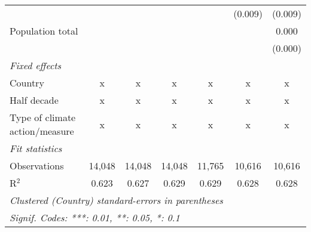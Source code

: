 \begin{tabular}{lcccccc}
                                                                                        &         &               &                &                & (0.009)        & (0.009)\\   
   Population total                                                                     &         &               &                &                &                & 0.000\\   
                                                                                        &         &               &                &                &                & (0.000)\\   
   \emph{Fixed effects}\\
   Country                                                                              & x       & x             & x              & x              & x              & x\\  
   Half decade                                                                          & x       & x             & x              & x              & x              & x\\  
   Type of climate action/measure                                                       & x       & x             & x              & x              & x              & x\\  
   \midrule \emph{Fit statistics}\\
   Observations                                                                         & 14,048  & 14,048        & 14,048         & 11,765         & 10,616         & 10,616\\  
   R$^2$                                                                                & 0.623   & 0.627         & 0.629          & 0.629          & 0.628          & 0.628\\  
   \midrule
   \multicolumn{7}{l}{\emph{Clustered (Country) standard-errors in parentheses}}\\
   \multicolumn{7}{l}{\emph{Signif. Codes: ***: 0.01, **: 0.05, *: 0.1}}\\
\end{tabular}
\par\endgroup



